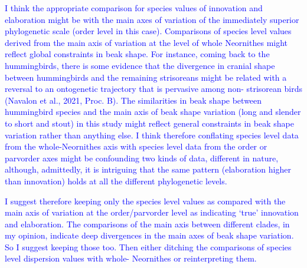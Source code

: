 \documentclass[12pt,letterpaper]{article}
\begin{document}
\textcolor{blue}{I think the appropriate comparison for species values of innovation and elaboration might be with the main axes of variation of the immediately superior phylogenetic scale (order level in this case). Comparisons of species level values derived from the main axis of variation at the level of whole Neornithes might reflect global constraints in beak shape. For instance, coming back to the hummingbirds, there is some evidence that the divergence in cranial shape between hummingbirds and the remaining strisoreans might be related with a reversal to an ontogenetic trajectory that is pervasive among non- strisorean birds (Navalon et al., 2021, Proc. B). The similarities in beak shape between hummingbird species and the main axis of beak shape variation (long and slender to short and stout) in this study might reflect general constraints in beak shape variation rather than anything else. I think therefore conflating species level data from the whole-Neornithes axis with species level data from the order or parvorder axes might be confounding two kinds of data, different in nature, although, admittedly, it is intriguing that the same pattern (elaboration higher than innovation) holds at all the different phylogenetic levels.}

\textcolor{blue}{I suggest therefore keeping only the species level values as compared with the main axis of variation at the order/parvorder level as indicating ‘true’ innovation and elaboration. The comparisons of the main axis between different clades, in my opinion, indicate deep divergences in the main axes of beak shape variation. So I suggest keeping those too. Then either ditching the comparisons of species level dispersion values with whole- Neornithes or reinterpreting them.}
\end{document}
